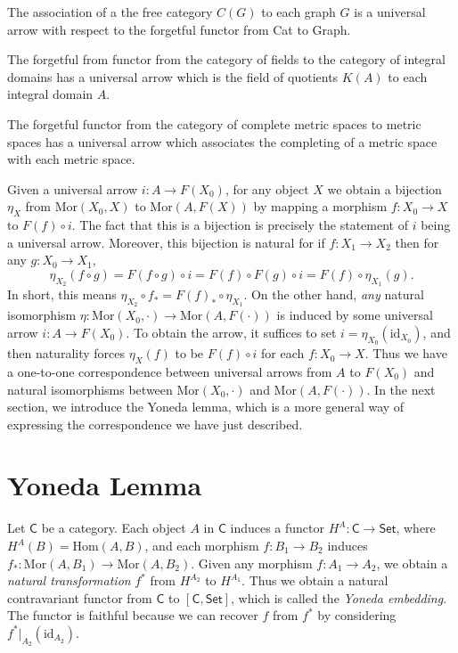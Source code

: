 \begin{example}
    The association of a the free category $C(G)$ to each graph $G$ is a universal arrow with respect to the forgetful functor from {\sf Cat} to {\sf Graph}.
\end{example}

\begin{example}
    The forgetful from functor from the category of fields to the category of integral domains has a universal arrow which is the field of quotients $K(A)$ to each integral domain $A$.
\end{example}

\begin{example}
    The forgetful functor from the category of complete metric spaces to metric spaces has a universal arrow which associates the completing of a metric space with each metric space.
\end{example}

Given a universal arrow $i: A \to F(X_0)$, for any object $X$ we obtain a bijection $\eta_X$ from $\text{Mor}(X_0,X)$ to $\text{Mor}(A,F(X))$ by mapping a morphism $f: X_0 \to X$ to $F(f) \circ i$. The fact that this is a bijection is precisely the statement of $i$ being a universal arrow. Moreover, this bijection is natural for if $f: X_1 \to X_2$ then for any $g: X_0 \to X_1$,
%
\[ \eta_{X_2}(f \circ g) = F(f \circ g) \circ i = F(f) \circ F(g) \circ i = F(f) \circ \eta_{X_1}(g).  \]
%
In short, this means $\eta_{X_2} \circ f_* = F(f)_* \circ \eta_{X_1}$. On the other hand, \emph{any} natural isomorphism $\eta: \text{Mor}(X_0,\cdot) \to \text{Mor}(A,F(\cdot))$ is induced by some universal arrow $i: A \to F(X_0)$. To obtain the arrow, it suffices to set $i = \eta_{X_0}(\text{id}_{X_0})$, and then naturality forces $\eta_X(f)$ to be $F(f) \circ i$ for each $f: X_0 \to X$. Thus we have a one-to-one correspondence between universal arrows from $A$ to $F(X_0)$ and natural isomorphisms between $\text{Mor}(X_0,\cdot)$ and $\text{Mor}(A,F(\cdot))$. In the next section, we introduce the Yoneda lemma, which is a more general way of expressing the correspondence we have just described.

\section{Yoneda Lemma}

Let $\mathsf{C}$ be a category. Each object $A$ in $\mathsf{C}$ induces a functor $H^A: \mathsf{C} \to \mathsf{Set}$, where $H^A(B) = \text{Hom}(A,B)$, and each morphism $f: B_1 \to B_2$ induces $f_*: \text{Mor}(A,B_1) \to \text{Mor}(A,B_2)$. Given any morphism $f: A_1 \to A_2$, we obtain a \emph{natural transformation} $f^*$ from $H^{A_2}$ to $H^{A_1}$. Thus we obtain a natural contravariant functor from $\mathsf{C}$ to $[\mathsf{C}, \mathsf{Set}]$, which is called the \emph{Yoneda embedding}. The functor is faithful because we can recover $f$ from $f^*$ by considering $f^*|_{A_2}(\text{id}_{A_2})$.

